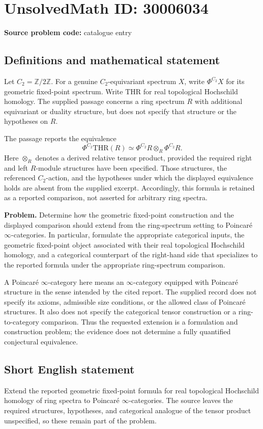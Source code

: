\documentclass[11pt]{article}
\newcommand{\Z}{\mathbb{Z}}
\begin{document}
\section*{UnsolvedMath ID: 30006034}
\textbf{Source problem code:} catalogue entry
\subsection{Definitions and mathematical statement}
Let \(C_2=\Z/2\Z\). For a genuine \(C_2\)-equivariant spectrum \(X\), write \(\Phi^{C_2}X\) for its geometric fixed-point spectrum. Write \(\mathrm{THR}\) for real topological Hochschild homology. The supplied passage concerns a ring spectrum \(R\) with additional equivariant or duality structure, but does not specify that structure or the hypotheses on \(R\).

The passage reports the equivalence
\[
\Phi^{C_2}\mathrm{THR}(R)
\simeq
\Phi^{C_2}R\otimes_R\Phi^{C_2}R.
\]
Here \(\otimes_R\) denotes a derived relative tensor product, provided the required right and left \(R\)-module structures have been specified. Those structures, the referenced \(C_2\)-action, and the hypotheses under which the displayed equivalence holds are absent from the supplied excerpt. Accordingly, this formula is retained as a reported comparison, not asserted for arbitrary ring spectra.

\textbf{Problem.} Determine how the geometric fixed-point construction and the displayed comparison should extend from the ring-spectrum setting to Poincar\'e \(\infty\)-categories. In particular, formulate the appropriate categorical inputs, the geometric fixed-point object associated with their real topological Hochschild homology, and a categorical counterpart of the right-hand side that specializes to the reported formula under the appropriate ring-spectrum comparison.

A Poincar\'e \(\infty\)-category here means an \(\infty\)-category equipped with Poincar\'e structure in the sense intended by the cited report. The supplied record does not specify its axioms, admissible size conditions, or the allowed class of Poincar\'e structures. It also does not specify the categorical tensor construction or a ring-to-category comparison. Thus the requested extension is a formulation and construction problem; the evidence does not determine a fully quantified conjectural equivalence.
\subsection{Short English statement}
Extend the reported geometric fixed-point formula for real topological Hochschild homology of ring spectra to Poincar\'e \(\infty\)-categories. The source leaves the required structures, hypotheses, and categorical analogue of the tensor product unspecified, so these remain part of the problem.
\end{document}
